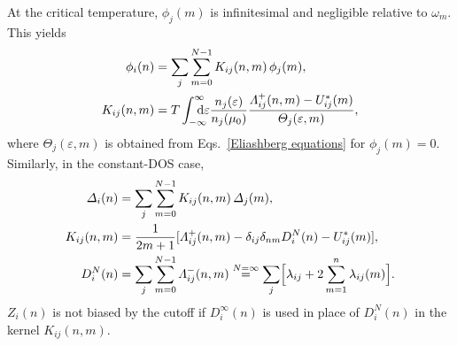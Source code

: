 \documentclass[a4paper]{article}
\def\D{\mathrm d}
\def\from#1{\sb{\mathrlap{#1}}}
\def\till#1{\sp{\mathrlap{#1}}}
\let\Delta\varDelta
\let\epsilon\varepsilon
\let\Lambda\varLambda
\let\Theta\varTheta
\newlength\gap
\begin{document}
   At the critical temperature, $\phi_j(m)$ is infinitesimal and negligible
   relative to $\omega_m$. This yields
   \begin{equation}
      \begin{split}
         \phi_i(n) &= \sum_j \sum_{m = 0}^{N - 1}
         K_{i j}(n, m) \, \phi_j(m),
         \\
         K_{i j}(n, m) &= T
         \int \from{-\infty} \till \infty \D \epsilon
         \frac{n_j(\epsilon)}{n_j(\mu_0)}
         \frac{\Lambda_{i j}^+(n, m) - U^*_{i j}(m)}{\Theta_j(\epsilon, m)},
      \end{split}
      \label{linearized equation}
   \end{equation}
   where $\Theta_j(\epsilon, m)$ is obtained from Eqs.~\ref{Eliashberg
   equations} for $\phi_j(m) = 0$. Similarly, in the constant-DOS case,
   \begin{equation}
      \begin{split}
         \Delta_i(n) &= \sum_j \sum_{m = 0}^{N - 1}
         K_{i j}(n, m) \, \Delta_j(m),
         \\
         K_{i j}(n, m) &= \frac 1 {2 m + 1} [\Lambda_{i j}^+(n, m)
         - \delta_{i j} \delta_{n m} D_i^N(n) - U^*_{i j}(m)],
         \\
         D_i^N(n) &= \sum_j \sum_{m = 0}^{N - 1} \Lambda_{i j}^-(n, m)
         \overset{N = \infty} =
         \sum_j \Bigl[ \lambda_{i j} + 2 \sum_{m = 1}^n \lambda_{i j}(m) \Bigr].
      \end{split}
      \label{linearized gap equation}
   \end{equation}
   $Z_i(n)$ is not biased by the cutoff if $D_i^\infty(n)$ is used in place of
   $D_i^N(n)$ in the kernel $K_{i j}(n, m)$.
\end{document}
